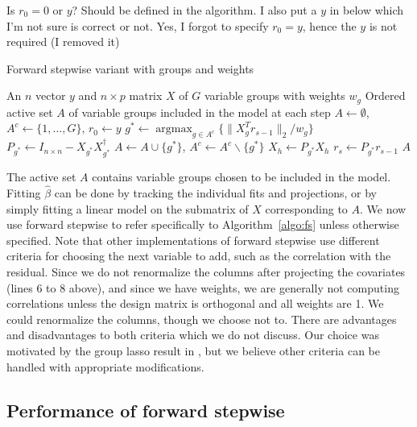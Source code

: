 \documentclass{imsart}
\newcommand{\argmax}{\mathop{\mathrm{argmax}}}
\newcommand{\norm}[1]{\lVert #1 \rVert}
\newcommand{\jonathan}[1]{{\color{blue}  #1}}
\newcommand{\josh}[1]{{\color{green} #1}}
\begin{document}
\jonathan{Is $r_0=0$ or $y$? Should be defined in the algorithm. I also put a $y$ in below which I'm not sure
is correct or not. }
\josh{Yes, I forgot to specify $r_0 = y$, hence the $y$ is not required (I removed it)}

\begin{algorithm}
  \caption{Forward stepwise variant with groups and weights}
  \label{algo:fs}
  \begin{algorithmic}[1]
    \REQUIRE An $n$ vector $y$ and $n \times p$ matrix $X$ of $G$ variable groups with weights $w_g$
    \ENSURE Ordered active set $A$ of variable groups included in the model at each step
    \STATE $A \gets \emptyset$, $A^c \gets \{ 1, \ldots, G\}$, $r_0 \gets y$
    \STATE $g^* \gets \argmax_{g \in A^c} \{ \norm{X_g^Tr_{s-1}}_2 / w_g \}$
    \STATE $P_{g^*} \gets I_{n\times n} - X_{g^*}X_{g^*}^\dagger$
    \STATE $A \gets A \cup \{ g^* \}$, $A^c \gets A^c \backslash \{ g^* \}$
      \STATE $X_h \gets P_{g^*} X_h$
    \ENDFOR
    \STATE $r_s \gets P_{g^*} r_{s-1}$
    \ENDFOR
    \RETURN $A$
  \end{algorithmic}
\end{algorithm}

The active set $A$ contains variable groups chosen to be included in
the model. Fitting $\hat \beta$ can be done by tracking the individual
fits and projections, or by simply fitting a linear model on the submatrix
of $X$ corresponding to $A$. 
We now use forward stepwise to refer specifically to
Algorithm~\ref{algo:fs} unless otherwise specified. Note that other
implementations of forward stepwise use different criteria for choosing
the next variable to add, such as the correlation with the residual.
Since we do not renormalize the columns after projecting the covariates
(lines 6 to 8 above), and since we have weights, we are generally not computing
correlations unless the design matrix is orthogonal and all weights are 1. We could
renormalize the columns, though we choose not to.
There are advantages and disadvantages to both criteria which we do not
discuss. Our choice was motivated by the group lasso result in
\cite{tests:adaptive}, but we believe other criteria can be handled
with appropriate modifications.

\subsection{Performance of forward stepwise}
\end{document}
